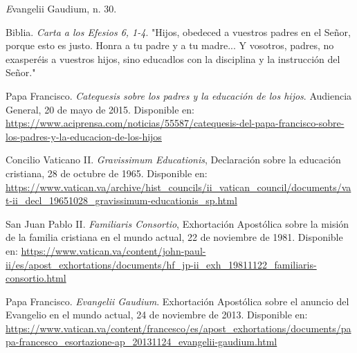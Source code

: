 \documentclass[a4paper,12pt]{article}
\begin{document}
	\hfill \textit Evangelii Gaudium, n. 30.

\noindent

\newpage
\begin{thebibliography}{9}
	
	Biblia. \textit{Carta a los Efesios 6, 1-4}. 
	"Hijos, obedeced a vuestros padres en el Señor, porque esto es justo. Honra a tu padre y a tu madre... Y vosotros, padres, no exasperéis a vuestros hijos, sino educadlos con la disciplina y la instrucción del Señor."
		
	
	Papa Francisco. \textit{Catequesis sobre los padres y la educación de los hijos}. Audiencia General, 20 de mayo de 2015. 
	Disponible en: \url{https://www.aciprensa.com/noticias/55587/catequesis-del-papa-francisco-sobre-los-padres-y-la-educacion-de-los-hijos}
	
	Concilio Vaticano II. \textit{Gravissimum Educationis}, Declaración sobre la educación cristiana, 28 de octubre de 1965. 
	Disponible en: \url{https://www.vatican.va/archive/hist_councils/ii_vatican_council/documents/vat-ii_decl_19651028_gravissimum-educationis_sp.html}
	
	San Juan Pablo II. \textit{Familiaris Consortio}, Exhortación Apostólica sobre la misión de la familia cristiana en el mundo actual, 22 de noviembre de 1981. 
	Disponible en: \url{https://www.vatican.va/content/john-paul-ii/es/apost_exhortations/documents/hf_jp-ii_exh_19811122_familiaris-consortio.html}
	
	Papa Francisco. \textit{Evangelii Gaudium}. Exhortación Apostólica sobre el anuncio del Evangelio en el mundo actual, 24 de noviembre de 2013. 
	Disponible en: \url{https://www.vatican.va/content/francesco/es/apost_exhortations/documents/papa-francesco_esortazione-ap_20131124_evangelii-gaudium.html}
	
	
\end{thebibliography}
\end{document}
